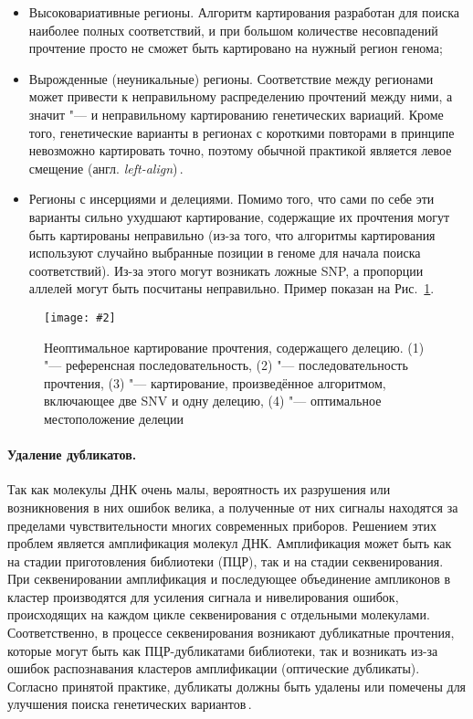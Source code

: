 \documentclass[a4paper,14pt]{extarticle}
\newcommand{\centerfigure}[5]
{\begin{figure}[#1]\centering\texttt{[image: \#2]}\caption{\label{#3}#4}\end{figure}}
\newcommand{\ecitep}[1]{\textenglish{\citep{#1}}}
\newcommand{\picref}[1]{Рис.~\ref{#1}}
\newcommand{\engterm}[1]{англ. \textenglish{\textit{#1}}}
\begin{document}
\begin{itemize}
	\item Высоковариативные регионы.
	 Алгоритм картирования разработан для поиска наиболее полных соответствий, и при большом количестве несовпадений прочтение просто не сможет быть картировано на нужный регион генома;
	\item Вырожденные (неуникальные) регионы.
	 Соответствие между регионами может привести к неправильному распределению прочтений между ними, а значит "--- и неправильному картированию генетических вариаций.
	 Кроме того, генетические варианты в регионах с короткими повторами в принципе невозможно картировать точно, поэтому обычной практикой является левое смещение (\engterm{left-align})\,\ecitep{Tan_2015}.
	\item Регионы с инсерциями и делециями.
	 Помимо того, что сами по себе эти варианты сильно ухудшают картирование, содержащие их прочтения могут быть картированы неправильно (из-за того, что алгоритмы картирования используют случайно выбранные позиции в геноме для начала поиска соответствий).
	 Из-за этого могут возникать ложные SNP, а пропорции аллелей могут быть посчитаны неправильно.
	 Пример показан на \picref{fig:indels}.
\end{itemize}

\centerfigure{h}{Indels.pdf}{fig:indels}{Неоптимальное картирование прочтения, содержащего делецию. (1) "--- референсная последовательность, (2) "--- последовательность прочтения, (3) "--- картирование, произведённое алгоритмом, включающее две SNV и одну делецию, (4) "--- оптимальное местоположение делеции}{0.7}

\paragraph{Удаление дубликатов.}
Так как молекулы ДНК очень малы, вероятность их разрушения или возникновения в них ошибок велика, а полученные от них сигналы находятся за пределами чувствительности многих современных приборов.
Решением этих проблем является амплификация молекул ДНК.
Амплификация может быть как на стадии приготовления библиотеки (ПЦР), так и на стадии секвенирования.
При секвенировании амплификация и последующее объединение ампликонов в кластер производятся для усиления сигнала и нивелирования ошибок, происходящих на каждом цикле секвенирования с отдельными молекулами.
Соответственно, в процессе секвенирования возникают дубликатные прочтения, которые могут быть как ПЦР\hyp{}дубликатами библиотеки, так и возникать из-за ошибок распознавания кластеров амплификации (оптические дубликаты).
Согласно принятой практике, дубликаты должны быть удалены или помечены для улучшения поиска генетических вариантов\,\ecitep{Auwera_2013}.
\end{document}
